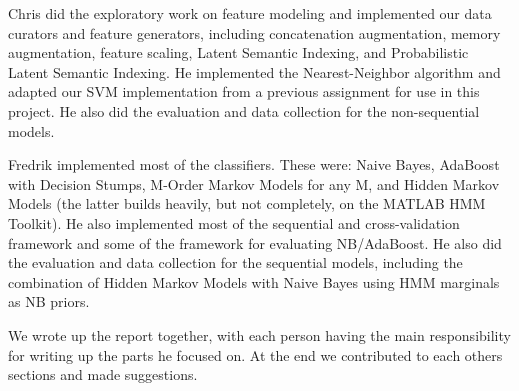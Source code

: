 \documentclass[10pt, twocolumn]{article}
\begin{document}
Chris did the exploratory work on feature modeling and implemented our data curators and feature generators, including concatenation augmentation, memory augmentation, feature scaling, Latent Semantic Indexing, and Probabilistic Latent Semantic Indexing. He implemented the Nearest-Neighbor algorithm and adapted our SVM implementation from a previous assignment for use in this project. He also did the evaluation and data collection for the non-sequential models. 

Fredrik implemented most of the classifiers. These were: Naive Bayes, AdaBoost with Decision Stumps, M-Order Markov Models for any M, and Hidden Markov Models (the latter builds heavily, but not completely, on the MATLAB HMM Toolkit).
He also implemented most of the sequential and cross-validation framework and some of the framework for evaluating NB/AdaBoost.
He also did the evaluation and data collection for the sequential models, including the combination of Hidden Markov Models with Naive Bayes using HMM marginals as NB priors.

We wrote up the report together, with each person having the main responsibility for writing up the parts he focused on. At the end we contributed to each others sections and made suggestions.




\end{document}
